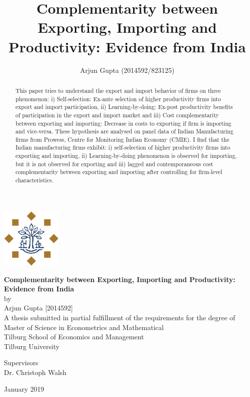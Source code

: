 \documentclass[12pt]{article}
\title{Complementarity between Exporting, Importing and Productivity: Evidence from India}
\author{Arjun Gupta (2014592/823125)}
\begin{document}

\begin{center}
\includegraphics[width=3cm]{./PICS/tilburg.png}
\bigskip
\bigskip
\bigskip
\bigskip

 \textbf{\Large Complementarity between Exporting, Importing and Productivity:
  Evidence from India}\\
\bigskip
\bigskip
by\\
Arjun Gupta [2014592]\\

\bigskip
\bigskip
\bigskip
\bigskip
 A thesis submitted in partial fulfillment of the requirements for the
 degree of Master of Science in Econometrics and Mathematical\\
 \bigskip
\bigskip
\bigskip
\bigskip
 Tilburg School of Economics and Management\\
 Tilburg University\\
 \bigskip
\bigskip
\bigskip
\bigskip

Supervisors \\
Dr. Christoph Walsh\\
 \bigskip
\bigskip
\bigskip
\bigskip

January 2019

\maketitle
\end{center}

%  

\begin{abstract}
This paper tries to understand the export and import behavior of
firms on three phenomenon: i) Self-selection: Ex-ante selection of higher
productivity firms into export and import participation,
ii) Learning-by-doing: Ex-post productivity benefits of participation
in the export and import market and iii) Cost complementarity between exporting
and importing: Decrease in costs to exporting if firm is importing and
vice-versa. These hypothesis are analysed on panel data of Indian
Manufacturing firms from Prowess, Centre for Monitoring Indian Economy
(CMIE). I find that the Indian manufacturing firms exhibit: i) self-selection of higher productivity
firms into exporting and importing, ii) Learning-by-doing phenomenon
is observed for importing, but it is not observed for exporting and
iii) lagged and contemporaneous cost complementarity between exporting
and importing after controlling for firm-level characteristics.  
\end{abstract}
\bigskip
\end{document}
